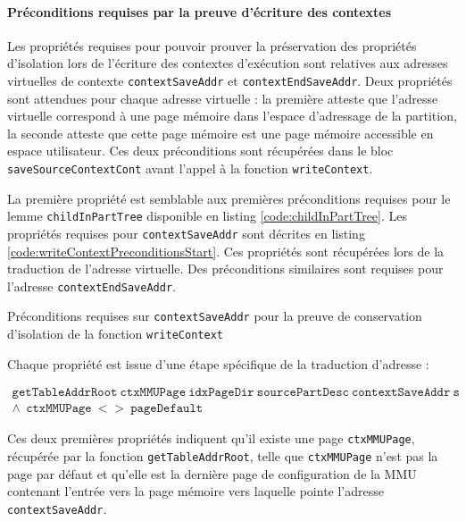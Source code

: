 			\paragraph{Préconditions requises par la preuve d'écriture des contextes}
			\label{sec:writeContextPreconditions}

			Les propriétés requises pour pouvoir prouver la préservation des propriétés d'isolation lors de l'écriture des contextes d'exécution sont relatives aux adresses virtuelles de contexte \texttt{contextSaveAddr} et \texttt{contextEndSaveAddr}. Deux propriétés sont attendues pour chaque adresse virtuelle : la première atteste que l'adresse virtuelle correspond à une page mémoire dans l'espace d'adressage de la partition, la seconde atteste que cette page mémoire est une page mémoire accessible en espace utilisateur. Ces deux préconditions sont récupérées dans le bloc \texttt{saveSourceContextCont} avant l'appel à la fonction \texttt{writeContext}.

			La première propriété est semblable aux premières préconditions requises pour le lemme \texttt{childInPartTree} disponible en listing \ref{code:childInPartTree}. Les propriétés requises pour \texttt{contextSaveAddr} sont décrites en listing \ref{code:writeContextPreconditionsStart}. Ces propriétés sont récupérées lors de la traduction de l'adresse virtuelle. Des préconditions similaires sont requises pour l'adresse \texttt{contextEndSaveAddr}.

			\begin{listing}[!ht]
				\caption{Préconditions requises sur \texttt{contextSaveAddr} pour la preuve de conservation d'isolation de la fonction \texttt{writeContext}}
				\label{code:writeContextPreconditionsStart}
			\end{listing}

			Chaque propriété est issue d'une étape spécifique de la traduction d'adresse :

			\begin{gather*}
				\mathtt{getTableAddrRoot~ctxMMUPage~idxPageDir~sourcePartDesc~contextSaveAddr~s}\\
				\wedge~~\mathtt{ctxMMUPage~<>~pageDefault}
			\end{gather*}

			Ces deux premières propriétés indiquent qu'il existe une page \texttt{ctxMMUPage}, récupérée par la fonction \texttt{getTableAddrRoot}, telle que \texttt{ctxMMUPage} n'est pas la page par défaut et qu'elle est la dernière page de configuration de la MMU contenant l'entrée vers la page mémoire vers laquelle pointe l'adresse \texttt{contextSaveAddr}.

